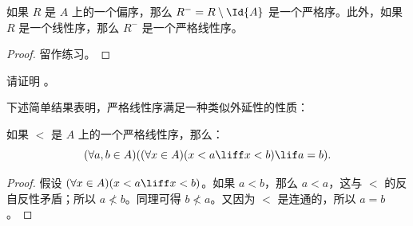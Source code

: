 \documentclass[../../../include/open-logic-section]{subfiles}
\begin{document}
\begin{prop}
如果 $R$ 是 $A$ 上的一个偏序，那么 $R^- = R \setminus \Id{A}$ 是一个严格序。此外，如果 $R$ 是一个线性序，那么 $R^-$ 是一个严格线性序。
\end{prop}

\begin{proof}
留作练习。
\end{proof}

\begin{prob}
请证明 。
\end{prob}

下述简单结果表明，严格线性序满足一种类似外延性的性质：

\begin{prop}
如果 $<$ 是 $A$ 上的一个严格线性序，那么：
\[
  (\forall a, b \in A)((\forall x \in A)(x < a \liff x < b) \lif a = b).
\]
\end{prop}

\begin{proof}
假设 $(\forall x \in A)(x < a \liff x < b)$。如果 $a < b$，那么 $a < a$，这与 $<$ 的反自反性矛盾；所以 $a \nless b$。同理可得 $b \nless a$。又因为 $<$ 是连通的，所以 $a = b$。
\end{proof}
\end{document}

